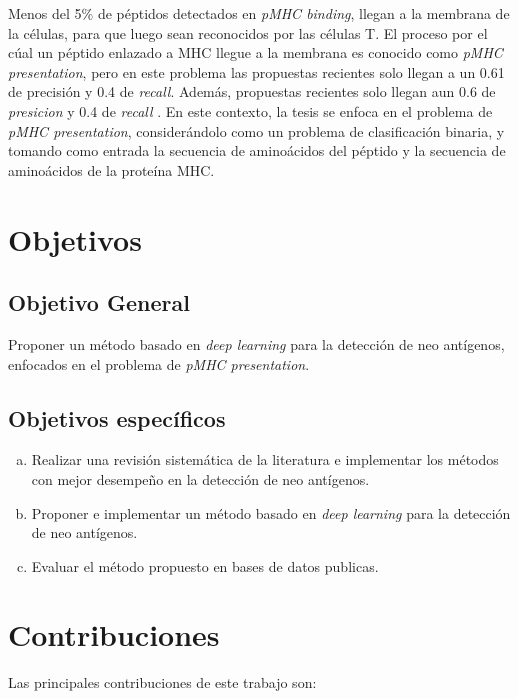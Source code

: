 Menos del 5\% de péptidos detectados en \textit{pMHC binding}, llegan a la membrana de la células, para que luego sean reconocidos por las células T.  El proceso por el cúal un péptido enlazado a MHC llegue a la membrana es conocido como  \textit{pMHC presentation}, pero en este problema las propuestas recientes solo llegan a un 0.61 de precisión y 0.4 de \textit{recall}. Además, propuestas recientes solo llegan aun 0.6 de \textit{presicion} y 0.4 de \textit{recall} \citep{mill2022neoms}. En este contexto, la tesis se enfoca en el problema de \textit{pMHC presentation}, considerándolo como un problema de clasificación binaria, y tomando como entrada la secuencia de aminoácidos del péptido y la secuencia de aminoácidos de la proteína MHC. 



\section{Objetivos}
\label{sec:objetivos}

\subsection{Objetivo General}

Proponer un método basado en \textit{deep learning} para la detección de neo antígenos, enfocados en el problema de \textit{pMHC presentation}. 

\subsection{Objetivos específicos}

\begin{enumerate}[(a)]
\item Realizar una revisión sistemática de la literatura e implementar los métodos con mejor desempeño en la detección de neo antígenos.
\item Proponer e implementar un método basado en \textit{deep learning} para la detección de neo antígenos.		
\item Evaluar el método propuesto en bases de datos publicas.
\end{enumerate}

\section{Contribuciones}
\label{sec:contribuciones}
Las principales contribuciones de este trabajo son:

